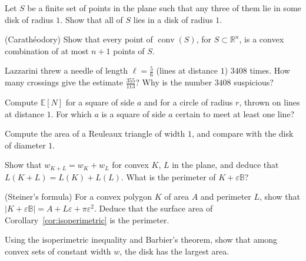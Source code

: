 \begin{exercise}[$\star\star$]\label{ex:hellydisk}
Let $S$ be a finite set of points in the plane such that any three of them lie in some disk of radius $1$. Show that all of $S$ lies in a disk of radius $1$.
\end{exercise}

\begin{exercise}[$\star\star$]\label{ex:caratheodory}
(Carath\'eodory) Show that every point of $\operatorname{conv}(S)$, for $S\subset\mathbb R^n$, is a convex combination of at most $n+1$ points of $S$.
\end{exercise}

\begin{exercise}[$\star$]\label{ex:lazzarini}
Lazzarini threw a needle of length $\ell=\frac56$ (lines at distance $1$) $3408$ times. How many crossings give the estimate $\frac{355}{113}$? Why is the number
$3408$ suspicious?
\end{exercise}

\begin{exercise}[$\star$]\label{ex:noodle}
Compute $\mathbb E[N]$ for a square of side $a$ and for a circle of radius $r$, thrown on lines at distance $1$. For which $a$ is a square of side $a$ certain to meet
at least one line?
\end{exercise}

\begin{exercise}[$\star$]\label{ex:reuleauxarea}
Compute the area of a Reuleaux triangle of width $1$, and compare with the disk of diameter $1$.
\end{exercise}

\begin{exercise}[$\star\star$]\label{ex:minkowskiwidth}
Show that $w_{K+L}=w_K+w_L$ for convex $K$, $L$ in the plane, and deduce that $L(K+L)=L(K)+L(L)$. What is the perimeter of $K+\varepsilon\mathbb B$?
\end{exercise}

\begin{exercise}[$\star\star$]\label{ex:steiner}
(Steiner's formula) For a convex polygon $K$ of area $A$ and perimeter $L$, show that $|K+\varepsilon\mathbb B|=A+L\varepsilon+\pi\varepsilon^2$. Deduce that the surface
area of Corollary~\ref{cor:isoperimetric} is the perimeter.
\end{exercise}

\begin{exercise}[$\star\star$]\label{ex:constwidthdisk}
Using the isoperimetric inequality and Barbier's theorem, show that among convex sets of constant width $w$, the disk has the largest area.
\end{exercise}

